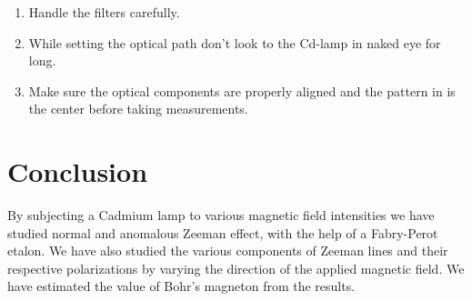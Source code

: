     \begin{enumerate}
        \item Handle the filters carefully.
        \item While setting the optical path don’t look to the Cd-lamp in naked eye for long.
        \item Make sure the optical components are properly aligned and the pattern in is the center before taking measurements.
    \end{enumerate}

\section{Conclusion}
By subjecting a Cadmium lamp to various magnetic
field intensities we have studied normal and anomalous Zeeman effect, with the help of a Fabry-Perot etalon. 
We have also studied the various components of Zeeman lines and their respective polarizations by varying the direction of the applied magnetic field.
We have estimated the value of Bohr's magneton from the results.